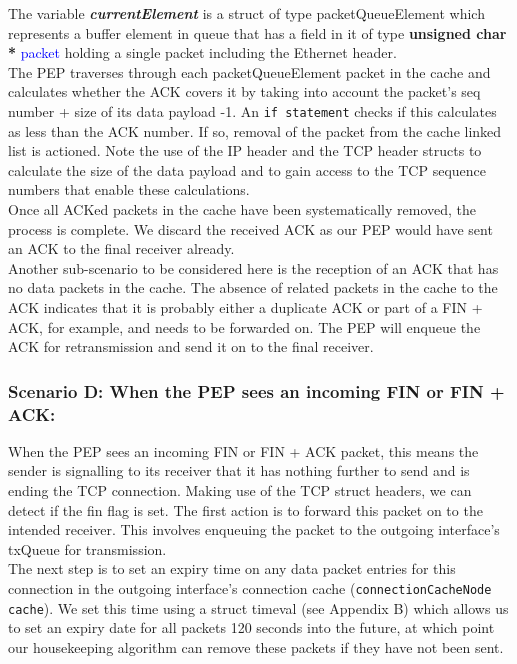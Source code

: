 The variable \textbf{\emph{currentElement}} is a struct of type packetQueueElement which represents a buffer element in queue that has a field in it of type \textbf{unsigned char *} \textcolor{blue}{packet} holding a single packet including the Ethernet header. \\

The PEP traverses through each packetQueueElement packet in the cache and calculates whether the ACK covers it by taking into account the packet's seq number + size of its data payload -1. An {\tt if statement} checks if this calculates as less than the ACK number. If so, removal of the packet from the cache linked list is actioned. Note the use of the IP header and the TCP header structs to calculate the size of the data payload and to gain access to the TCP sequence numbers that enable these calculations. \\

Once all ACKed packets in the cache have been systematically removed, the process is complete. We discard the received ACK as our PEP would have sent an ACK to the final receiver already. \\

Another sub-scenario to be considered here is the reception of an ACK that has no data packets in the cache. The absence of related packets in the cache to the ACK indicates that it is probably either a duplicate ACK or part of a FIN + ACK, for example, and needs to be forwarded on. The PEP will enqueue the ACK for retransmission and send it on to the final receiver.


\subsubsection{Scenario D: When the PEP sees an incoming FIN or FIN + ACK:}

When the PEP sees an incoming FIN or FIN + ACK packet, this means the sender is signalling to its receiver that it has nothing further to send and is ending the TCP connection. Making use of the TCP struct headers, we can detect if the fin flag is set. The first action is to forward this packet on to the intended receiver. This involves enqueuing the packet to the outgoing interface's txQueue for transmission.\\

The next step is to set an expiry time on any data packet entries for this connection in the outgoing interface's connection cache ({\tt connectionCacheNode cache}). We set this time using  a struct timeval (see Appendix B) which allows us to set an expiry date for all packets 120 seconds into the future, at which point our housekeeping algorithm can remove these packets if they have not been sent. \\

